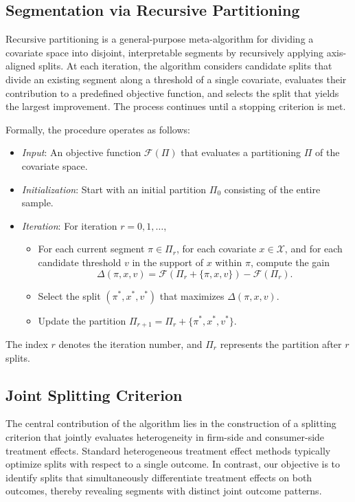 \documentclass[11pt,letterpaper,english]{article}
\theoremstyle{definition}
\theoremstyle{definition}
\begin{document}
\begin{bibunit}
\subsection{Segmentation via Recursive Partitioning}
\label{ssec:recur_part}

Recursive partitioning is a general-purpose meta-algorithm for dividing a covariate space into disjoint, interpretable segments by recursively applying axis-aligned splits. At each iteration, the algorithm considers candidate splits that divide an existing segment along a threshold of a single covariate, evaluates their contribution to a predefined objective function, and selects the split that yields the largest improvement. The process continues until a stopping criterion is met.

Formally, the procedure operates as follows:
\begin{itemize}
    \item \emph{Input}: An objective function $\mathcal{F}(\Pi)$ that evaluates a partitioning $\Pi$ of the covariate space.
    \item \emph{Initialization}: Start with an initial partition $\Pi_0$ consisting of the entire sample.
    \item \emph{Iteration}: For iteration $r=0,1,\dots$,
    \begin{itemize}
        \item For each current segment $\pi \in \Pi_r$, for each covariate $x \in \mathcal{X}$, and for each candidate threshold $v$ in the support of $x$ within $\pi$, compute the gain
        \[
        \Delta(\pi,x,v) = \mathcal{F}(\Pi_r + \{\pi,x,v\}) - \mathcal{F}(\Pi_r).
        \]
        \item Select the split $(\pi^*,x^*,v^*)$ that maximizes $\Delta(\pi,x,v)$.
        \item Update the partition $\Pi_{r+1} = \Pi_r + \{\pi^*,x^*,v^*\}$.
    \end{itemize}
\end{itemize}

The index $r$ denotes the iteration number, and $\Pi_r$ represents the partition after $r$ splits.

\subsection{Joint Splitting Criterion}
\label{sec:spliting_criterion}

The central contribution of the algorithm lies in the construction of a splitting criterion that jointly evaluates heterogeneity in firm-side and consumer-side treatment effects. Standard heterogeneous treatment effect methods typically optimize splits with respect to a single outcome. In contrast, our objective is to identify splits that simultaneously differentiate treatment effects on both outcomes, thereby revealing segments with distinct joint outcome patterns.


\end{bibunit}
\end{document}
